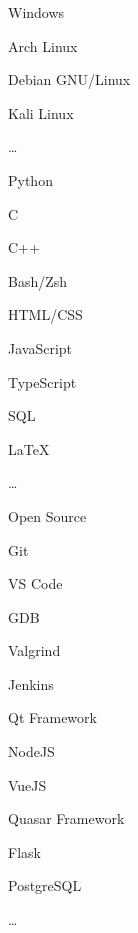 \begin{multicols}{3}
\begin{compactitem}[\color{Cyan}$\circ$]
	\item Windows
	\item Arch Linux
	\item Debian GNU/Linux
	\item Kali Linux
	\item \ldots
\end{compactitem}
\end{multicols}

\SmallSep

\begin{multicols}{3}
\begin{compactitem}[\color{Cyan}$\circ$]
    \item Python
	\item C
    \item C++
    \item Bash/Zsh
    \item HTML/CSS
    \item JavaScript
    \item TypeScript
    \item SQL
    \item \LaTeX
	\item \ldots
\end{compactitem}
\end{multicols}

\SmallSep

\begin{multicols}{3}
\begin{compactitem}[\color{Cyan}$\circ$]
    \item Open Source \heart\
    \item Git
    \item VS Code
    \item GDB
    \item Valgrind
    \item Jenkins
    \item Qt Framework
    \item NodeJS
    \item VueJS
    \item Quasar Framework
    \item Flask
    \item PostgreSQL
    \item \ldots
\end{compactitem}
\end{multicols}


